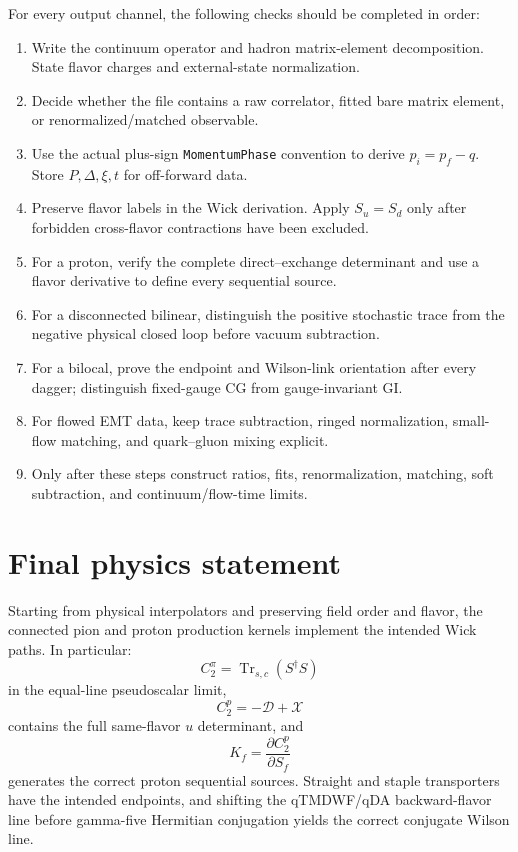 \documentclass[11pt,a4paper]{article}
\numberwithin{equation}{section}
\newcommand{\Trsc}{\operatorname{Tr}_{s,c}}
\newcommand{\code}[1]{%
  \ifmmode\text{\texttt{\detokenize{#1}}}\else\nolinkurl{#1}\fi}
\begin{document}
For every output channel, the following checks should be completed in order:
\begin{enumerate}
  \item Write the continuum operator and hadron matrix-element decomposition.
        State flavor charges and external-state normalization.
  \item Decide whether the file contains a raw correlator, fitted bare matrix
        element, or renormalized/matched observable.
  \item Use the actual plus-sign \code{MomentumPhase} convention to derive
        \(p_i=p_f-q\).  Store \(P,\Delta,\xi,t\) for off-forward data.
  \item Preserve flavor labels in the Wick derivation.  Apply
        \(S_u=S_d\) only after forbidden cross-flavor contractions have been
        excluded.
  \item For a proton, verify the complete direct--exchange determinant and
        use a flavor derivative to define every sequential source.
  \item For a disconnected bilinear, distinguish the positive stochastic
        trace from the negative physical closed loop before vacuum
        subtraction.
  \item For a bilocal, prove the endpoint and Wilson-link orientation after
        every dagger; distinguish fixed-gauge CG from gauge-invariant GI.
  \item For flowed EMT data, keep trace subtraction, ringed normalization,
        small-flow matching, and quark--gluon mixing explicit.
  \item Only after these steps construct ratios, fits, renormalization,
        matching, soft subtraction, and continuum/flow-time limits.
\end{enumerate}

\section{Final physics statement}

Starting from physical interpolators and preserving field order and flavor,
the connected pion and proton production kernels implement the intended Wick
paths.  In particular:
\begin{equation}
 C_2^\pi=\Trsc(S^\dagger S)
\end{equation}
in the equal-line pseudoscalar limit,
\begin{equation}
 C_2^p=-\mathcal D+\mathcal X
\end{equation}
contains the full same-flavor \(u\) determinant, and
\begin{equation}
 K_f=\frac{\partial C_2^p}{\partial S_f}
\end{equation}
generates the correct proton sequential sources.  Straight and staple
transporters have the intended endpoints, and shifting the qTMDWF/qDA
backward-flavor line before gamma-five Hermitian conjugation yields the
correct conjugate Wilson line.
\end{document}
